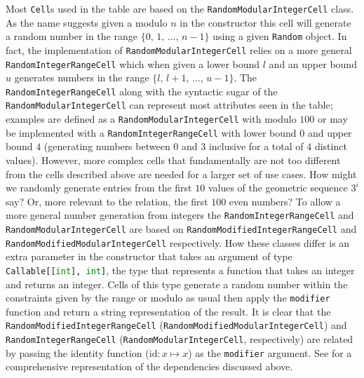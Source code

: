 Most \lstinline{Cell}s used in the  table are based on the
\lstinline{RandomModularIntegerCell} class. As the name suggests given a modulo
$n$ in the constructor this cell will generate a random number in the range $\{0,
\,1,\,\ldots,\,n - 1\}$ using a given \lstinline{Random} object. In fact, the
implementation of \lstinline{RandomModularIntegerCell} relies on a more general
\lstinline{RandomIntegerRangeCell} which when given a lower bound $l$ and an
upper bound $u$ generates numbers in the range $\{l,\,l + 1,\,\ldots,\,u - 1\}$.
The \lstinline{RandomIntegerRangeCell} along with the syntactic sugar of the
\lstinline{RandomModularIntegerCell} can represent most attributes seen in the
 table; examples are  defined as a
\lstinline{RandomModularIntegerCell} with modulo $100$ or
 may be implemented with a
\lstinline{RandomIntegerRangeCell} with lower bound $0$ and upper bound $4$
(generating numbers between $0$ and $3$ inclusive for a total of $4$ distinct
values). However, more complex cells that fundamentally are not too different
from the cells described above are needed for a larger set of use cases. How
might we randomly generate entries from the first $10$ values of the geometric
sequence $3^i$ say? Or, more relevant to the  relation, the
first $100$ even numbers? To allow a more general number generation from
integers the \lstinline{RandomIntegerRangeCell} and
\lstinline{RandomModularIntegerCell} are based on
\lstinline{RandomModifiedIntegerRangeCell} and
\lstinline{RandomModifiedModularIntegerCell} respectively. How these classes
differ is an extra parameter in the constructor that takes an argument of type
\lstinline[language=Python]{Callable[[int], int]}, the type that represents a function that takes an integer
and returns an integer. Cells of this type generate a random number within the
constraints given by the range or modulo as usual then apply the
\lstinline{modifier} function and return a string representation of the result.
It is clear that the \lstinline{RandomModifiedIntegerRangeCell}
(\lstinline{RandomModifiedModularIntegerCell}) and
\lstinline{RandomIntegerRangeCell} (\lstinline{RandomModularIntegerCell},
respectively)
are related by passing the identity function ($\mathrm{id}: x \mapsto x$) as the
\lstinline{modifier} argument. See
 for a
comprehensive representation of the dependencies discussed above.

